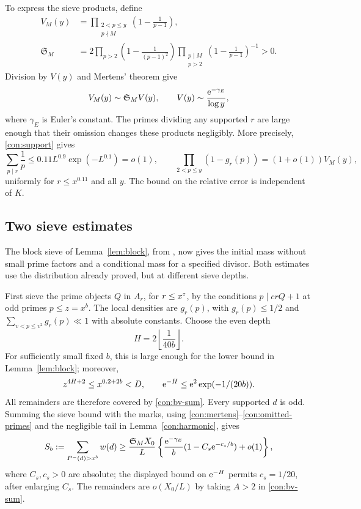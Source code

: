 To express the sieve products, define
\begin{equation}\label{con:singular-product}
 \begin{split}
 V_M(y)&=\prod_{\substack{2<p\le y\\p\nmid M}}
                            \left(1-\frac1{p-1}\right),\\
 \mathfrak S_M&=2\prod_{p>2}\left(1-\frac1{(p-1)^2}\right)
       \prod_{\substack{p\mid M\\p>2}}
                            \left(1-\frac1{p-1}\right)^{-1}>0.
 \end{split}
\end{equation}
Division by \(V(y)\) and Mertens' theorem give
\begin{equation}\label{con:mertens}
 V_M(y)\sim\mathfrak S_M V(y),\qquad
 V(y)\sim\frac{\mathrm{e}^{-\gamma_E}}{\log y},
\end{equation}
where \(\gamma_E\) is Euler's constant.  The primes dividing any
supported \(r\) are large enough that their omission changes these
products negligibly.  More precisely, \eqref{con:support} gives
\begin{equation}\label{con:omitted-primes}
 \sum_{p\mid r}\frac1p\le0.11L^{0.9}\exp(-L^{0.1})=o(1),
 \qquad
 \prod_{2<p\le y}(1-g_r(p))=(1+o(1))V_M(y),
\end{equation}
uniformly for \(r\le x^{0.11}\) and all \(y\).  The bound on the
relative error is independent of \(K\).

\subsection{Two sieve estimates}

The block sieve of Lemma~\ref{lem:block}, from
\cite[Lemma~2.9]{BlockPaper}, now gives the initial mass without
small prime factors and a conditional mass for a specified divisor.
Both estimates use the distribution already proved, but at different
sieve depths.

First sieve the prime objects \(Q\) in \(A_r\), for
\(r\le x^\varepsilon\), by the conditions \(p\mid crQ+1\) at odd
primes \(p\le z=x^b\).  The local densities are \(g_r(p)\),
with \(g_r(p)\le1/2\) and
\(\sum_{v<p\le v^2}g_r(p)\ll1\) with absolute constants.
Choose the even depth
\[
 H=2\left\lfloor\frac1{40b}\right\rfloor.
\]
For sufficiently small fixed \(b\), this is large enough for the
lower bound in Lemma~\ref{lem:block}; moreover,
\[
 z^{4H+2}\le x^{0.2+2b}<D,\qquad
 \mathrm{e}^{-H}\le\mathrm{e}^2\exp(-1/(20b)).
\]
All remainders are therefore covered by \eqref{con:bv-sum}.
Every supported \(d\) is odd.  Summing the sieve bound with the
marks, using \eqref{con:mertens}--\eqref{con:omitted-primes} and
the negligible tail in Lemma~\ref{con:harmonic}, gives
\begin{equation}\label{con:initial-lower}
 S_b:=\sum_{P^-(d)>x^b}w(d)
 \ge\frac{\mathfrak S_M X_0}{L}
 \left\{\frac{\mathrm{e}^{-\gamma_E}}b
              (1-C_s\mathrm{e}^{-c_s/b})+o(1)\right\},
\end{equation}
where \(C_s,c_s>0\) are absolute; the displayed bound on \(\mathrm{e}^{-H}\)
permits \(c_s=1/20\), after enlarging \(C_s\).
The remainders are
\(o(X_0/L)\) by taking \(A>2\) in \eqref{con:bv-sum}.

